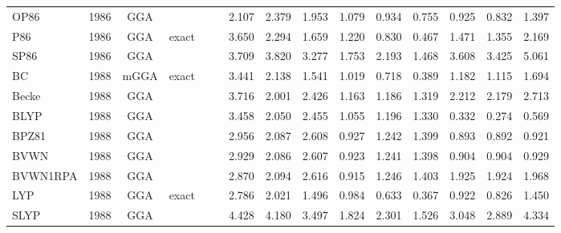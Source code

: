 \begin{landscape}
\begin{longtable}{ll:cccc:rrr:rrr:rrr}
    OP86             & 1986 & GGA  &          &             &           & 2.107             & 2.379             & 1.953  & 1.079              & 0.934             & 0.755  & 0.925   & 0.832 & 1.397 \\
    P86              & 1986 & GGA  & exact    &             &           & 3.650             & 2.294             & 1.659  & 1.220              & 0.830             & 0.467  & 1.471   & 1.355 & 2.169 \\
    SP86             & 1986 & GGA  &          &             &           & 3.709             & 3.820             & 3.277  & 1.753              & 2.193             & 1.468  & 3.608   & 3.425 & 5.061 \\
    BC               & 1988 & mGGA & exact    &             &           & 3.441             & 2.138             & 1.541  & 1.019              & 0.718             & 0.389  & 1.182   & 1.115 & 1.694 \\
    Becke            & 1988 & GGA  &          &             &           & 3.716             & 2.001             & 2.426  & 1.163              & 1.186             & 1.319  & 2.212   & 2.179 & 2.713 \\
    BLYP             & 1988 & GGA  &          &             &           & 3.458             & 2.050             & 2.455  & 1.055              & 1.196             & 1.330  & 0.332   & 0.274 & 0.569 \\
    BPZ81            & 1988 & GGA  &          &             &           & 2.956             & 2.087             & 2.608  & 0.927              & 1.242             & 1.399  & 0.893   & 0.892 & 0.921 \\
    BVWN             & 1988 & GGA  &          &             &           & 2.929             & 2.086             & 2.607  & 0.923              & 1.241             & 1.398  & 0.904   & 0.904 & 0.929 \\
    BVWN1RPA         & 1988 & GGA  &          &             &           & 2.870             & 2.094             & 2.616  & 0.915              & 1.246             & 1.403  & 1.925   & 1.924 & 1.968 \\
    LYP              & 1988 & GGA  & exact    &             &           & 2.786             & 2.021             & 1.496  & 0.984              & 0.633             & 0.367  & 0.922   & 0.826 & 1.450 \\
    SLYP             & 1988 & GGA  &          &             &           & 4.428             & 4.180             & 3.497  & 1.824              & 2.301             & 1.526  & 3.048   & 2.889 & 4.334 \\

\end{longtable}
\end{landscape}
